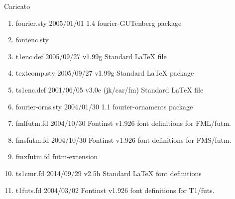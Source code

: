 Caricato 
\begin{enumerate}
\item 	fourier.sty 2005/01/01 1.4 fourier-GUTenberg package
\item 	fontenc.sty
\item 	t1enc.def 2005/09/27 v1.99g Standard LaTeX file
\item 	textcomp.sty 2005/09/27 v1.99g Standard LaTeX package
\item 	ts1enc.def 2001/06/05 v3.0e (jk/car/fm) Standard LaTeX file
\item 	fourier-orns.sty 2004/01/30 1.1 fourier-ornaments package
\item 	fmlfutm.fd 2004/10/30 Fontinst v1.926 font definitions for FML/futm.
\item 	fmsfutm.fd 2004/10/30 Fontinst v1.926 font definitions for FMS/futm.
\item 	fmxfutm.fd futm-extension
\item 	ts1cmr.fd 2014/09/29 v2.5h Standard LaTeX font definitions
\item 	t1futs.fd 2004/03/02 Fontinst v1.926 font definitions for T1/futs.
\end{enumerate}	
